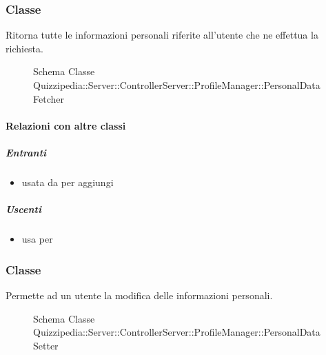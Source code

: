 \subsubsection{Classe }
Ritorna tutte le informazioni personali riferite all'utente che ne effettua la richiesta.
\begin{figure}[H]
\centering
\noindent{}
\caption[Schema Classe PersonalDataFetcher]{Schema Classe Quizzipedia::Server::ControllerServer::ProfileManager::PersonalDataFetcher}
\end{figure}
\paragraph{Relazioni con altre classi}
\subparagraph{Entranti}
\begin{itemize}
\item usata da  per aggiungi
\end{itemize}
\subparagraph{Uscenti}
\begin{itemize}
\item usa  per 
\end{itemize}
\subsubsection{Classe }
Permette ad un utente la modifica delle informazioni personali.
\begin{figure}[H]
\centering
\noindent{}
\caption[Schema Classe PersonalDataSetter]{Schema Classe Quizzipedia::Server::ControllerServer::ProfileManager::PersonalDataSetter}
\end{figure}
